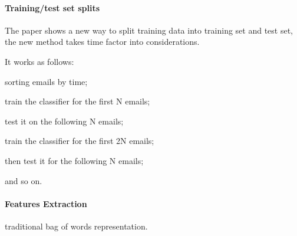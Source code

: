 \documentclass[12pt]{article}
\newenvironment{my_itemize}
{\begin{itemize}
  \setlength{\itemsep}{0cm}
  \setlength{\parskip}{0cm}}
{\end{itemize}}
\begin{document}
\paragraph{Training/test set splits}
\begin{my_itemize}
    \item The paper shows a new way to split training data into training set 
	  and test set, the new method takes time factor into considerations.
    \item It works as follows:
    \begin{my_itemize}
        \item sorting emails by time;
        \item train the classifier for the first N emails;
        \item test it on the following N emails;
        \item train the classifier for the first 2N emails;
        \item then test it for the following N emails;
        \item and so on.
    \end{my_itemize}
\end{my_itemize}

\paragraph{Features Extraction}
traditional bag of words representation.
\end{document}
